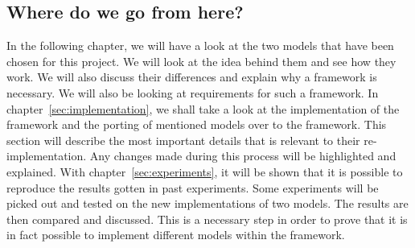 \subsection{Where do we go from here?}
In the following chapter, we will have a look at the two models that have been chosen for this project. We will look at the idea behind them and see how they work. We will also discuss their differences and explain why a framework is necessary. We will also be looking at requirements for such a framework. In chapter~\ref{sec:implementation}, we shall take a look at the implementation of the framework and the porting of mentioned models over to the framework. This section will describe the most important details that is relevant to their re-implementation. Any changes made during this process will be highlighted and explained. With chapter~\ref{sec:experiments}, it will be shown that it is possible to reproduce the results gotten in past experiments. Some experiments will be picked out and tested on the new implementations of two models. The results are then compared and discussed. This is a necessary step in order to prove that it is in fact possible to implement different models within the framework.
